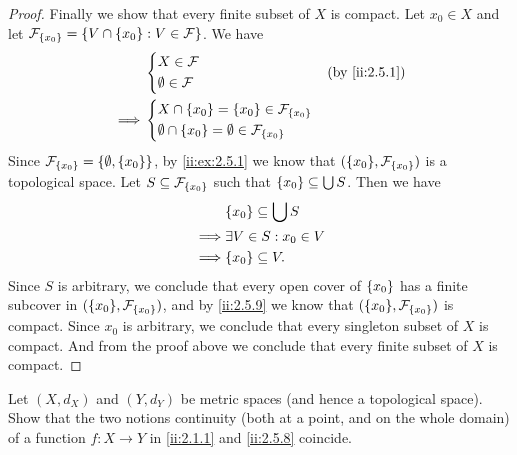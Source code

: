 \begin{proof}
  Finally we show that every finite subset of \(X\) is compact.
  Let \(x_0 \in X\) and let \(\mathcal{F}_{\left\lbrace x_0\right\rbrace} = \left\lbrace V \cap \left\lbrace x_0\right\rbrace : V \in \mathcal{F}\right\rbrace\).
  We have
  \begin{align*}
             & \begin{dcases}
                 X \in \mathcal{F} \\
                 \emptyset \in \mathcal{F}
               \end{dcases}                                        &  & \by{ii:2.5.1} \\
    \implies & \begin{dcases}
                 X \cap \set{x_0} = \set{x_0} \in \mathcal{F}_{\set{x_0}} \\
                 \emptyset \cap \set{x_0} = \emptyset \in \mathcal{F}_{\set{x_0}}
               \end{dcases}
  \end{align*}
  Since \(\mathcal{F}_{\left\lbrace x_0\right\rbrace} = \left\lbrace\emptyset, \left\lbrace x_0\right\rbrace\right\rbrace\), by \cref{ii:ex:2.5.1} we know that \((\set{x_0}, \mathcal{F}_{\set{x_0}})\) is a topological space.
  Let \(S \subseteq \mathcal{F}_{\left\lbrace x_0\right\rbrace}\) such that \(\left\lbrace x_0\right\rbrace \subseteq \bigcup S\).
  Then we have
  \begin{align*}
             & \set{x_0} \subseteq \bigcup S \\
    \implies & \exists V \in S : x_0 \in V   \\
    \implies & \set{x_0} \subseteq V.
  \end{align*}
  Since \(S\) is arbitrary, we conclude that every open cover of \(\left\lbrace x_0\right\rbrace\) has a finite subcover in \((\set{x_0}, \mathcal{F}_{\set{x_0}})\), and by \cref{ii:2.5.9} we know that \((\set{x_0}, \mathcal{F}_{\set{x_0}})\) is compact.
  Since \(x_0\) is arbitrary, we conclude that every singleton subset of \(X\) is compact.
  And from the proof above we conclude that every finite subset of \(X\) is compact.
\end{proof}

\begin{ex}\label{ii:ex:2.5.15}
  Let \((X, d_X)\) and \((Y, d_Y)\) be metric spaces (and hence a topological space).
  Show that the two notions continuity (both at a point, and on the whole domain) of a function \(f : X \to Y\) in \cref{ii:2.1.1} and \cref{ii:2.5.8} coincide.
\end{ex}

